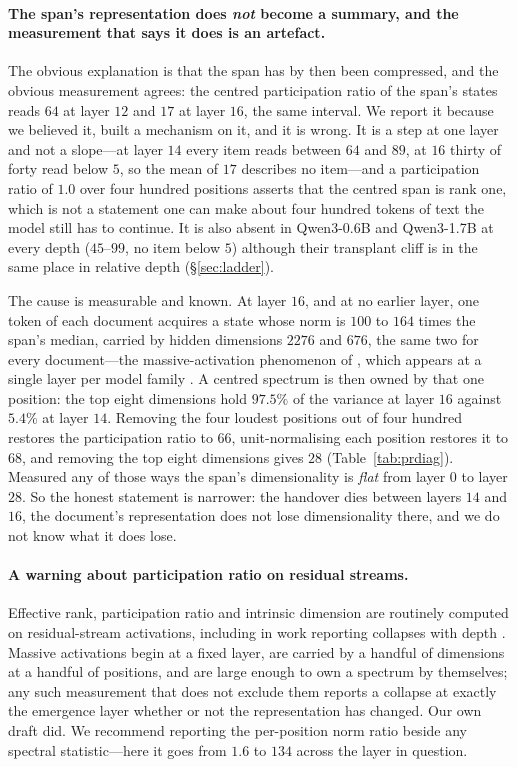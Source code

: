\documentclass{article}
\begin{document}
\paragraph{The span's representation does \emph{not} become a summary, and the
measurement that says it does is an artefact.} The obvious explanation is that
the span has by then been compressed, and the obvious measurement agrees: the
centred participation ratio of the span's states reads $64$ at layer $12$ and
$17$ at layer $16$, the same interval. We report it because we believed it,
built a mechanism on it, and it is wrong. It is a step at one layer and not a
slope---at layer $14$ every item reads between $64$ and $89$, at $16$ thirty of
forty read below $5$, so the mean of $17$ describes no item---and a
participation ratio of $1.0$ over four hundred positions asserts that the
centred span is rank one, which is not a statement one can make about four
hundred tokens of text the model still has to continue. It is also absent in
Qwen3-0.6B and Qwen3-1.7B at every depth ($45$--$99$, no item below $5$) although
their transplant cliff is in the same place in relative depth
(\S\ref{sec:ladder}).

The cause is measurable and known. At layer $16$, and at no earlier layer, one
token of each document acquires a state whose norm is $100$ to $164$ times the
span's median, carried by hidden dimensions $2276$ and $676$, the same two for
every document---the massive-activation phenomenon of \citet{sun2024massive},
which appears at a single layer per model family \citep{shi2026melayer}. A
centred spectrum is then owned by that one position: the top eight dimensions
hold $97.5\%$ of the variance at layer $16$ against $5.4\%$ at layer $14$.
Removing the four loudest positions out of four hundred restores the
participation ratio to $66$, unit-normalising each position restores it to $68$,
and removing the top eight dimensions gives $28$ (Table~\ref{tab:prdiag}).
Measured any of those ways the span's dimensionality is \emph{flat} from layer
$0$ to layer $28$. So the honest statement is narrower: the handover dies
between layers $14$ and $16$, the document's representation does not lose
dimensionality there, and we do not know what it does lose.



\paragraph{A warning about participation ratio on residual streams.} Effective
rank, participation ratio and intrinsic dimension are routinely computed on
residual-stream activations, including in work reporting collapses with depth
\citep{fernando2026residualspectral, sarkar2026causaldim}. Massive activations
begin at a fixed layer, are carried by a handful of dimensions at a handful of
positions, and are large enough to own a spectrum by themselves; any such
measurement that does not exclude them reports a collapse at exactly the
emergence layer whether or not the representation has changed. Our own draft
did. We recommend reporting the per-position norm ratio beside any spectral
statistic---here it goes from $1.6$ to $134$ across the layer in question.
\end{document}
